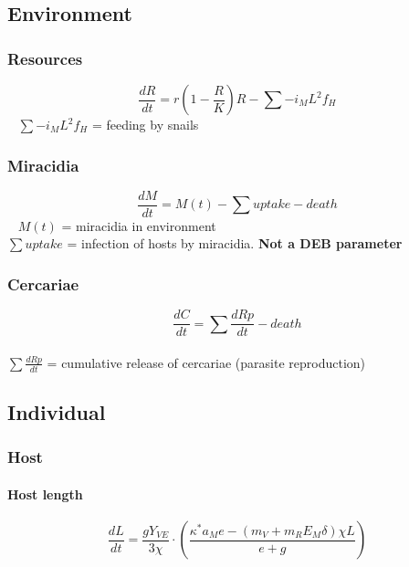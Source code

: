 \documentclass[10,portrait]{article}
\let\oldparagraph\paragraph
\renewcommand{\paragraph}[1]{\oldparagraph{#1}\mbox{}}
\begin{document}
\newpage  

\subsection{Environment}\label{environment}

\subsubsection{Resources}\label{resources}

\[
\frac
{dR}
{dt}
= r
  \left(
  1-\frac{R}{K}
  \right)
  R -
  \sum -i_{M}L^{2}f_{H}
\] ~ \(\sum -i_{M}L^{2}f_{H}\) = feeding by snails

\subsubsection{Miracidia}\label{miracidia}

\[
\frac
{dM}
{dt}
= M(t)
- \sum uptake 
- death
\] ~ \(M(t)\) = miracidia in environment\\
\(\sum uptake\) = infection of hosts by miracidia. \textbf{Not a DEB
parameter}

\subsubsection{Cercariae}\label{cercariae}

\[
\frac
{dC}
{dt}
= \sum \frac{dRp}{dt} 
- death
\] ~\\
\(\sum \frac{dRp}{dt}\) = cumulative release of cercariae (parasite
reproduction)

\newpage  

\subsection{Individual}\label{individual}

\subsubsection{Host}\label{host}

\paragraph{Host length}\label{host-length}

\[
  \frac 
    {d L}
    {d t}
    = \frac
      {gY_{VE}}
      {3\chi} 
        \cdot \left( \frac 
        {\kappa^{*} a_{M}e - (m_{V} + m_{R}E_{M}\delta)\chi L}
        {e + g}
        \right)
\]
\end{document}
